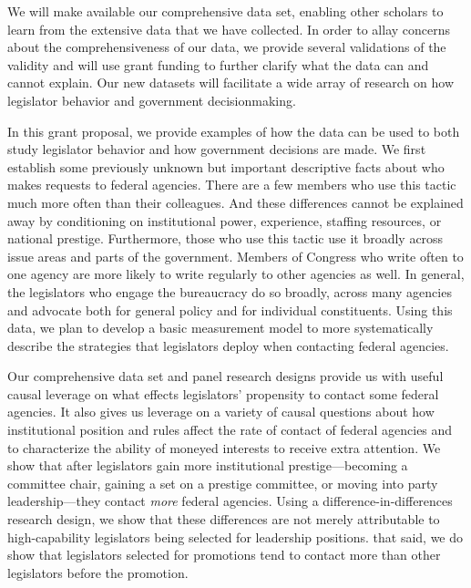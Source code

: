 \documentclass{article}
\begin{document}
We will make available our comprehensive data set, enabling other scholars to learn from the extensive data that we have collected.  In order to allay concerns about the comprehensiveness of our data, we provide several validations of the validity and will use grant funding to further clarify what the data can and cannot explain. Our new datasets will facilitate a wide array of research on how legislator behavior and government decisionmaking.    

In this grant proposal, we provide examples of how the data can be used to both study legislator behavior and how government decisions are made.  We first establish some previously unknown but important descriptive facts about who makes requests to federal agencies. There are a few members who use this tactic much more often than their colleagues.  And these differences cannot be explained away by conditioning on institutional power, experience, staffing resources, or national prestige. Furthermore, those who use this tactic use it broadly across issue areas and parts of the government.  Members of Congress who write often to one agency are more likely to write regularly to other agencies as well.  In general, the legislators who engage the bureaucracy do so broadly, across many agencies and advocate both for general policy and for individual constituents.  Using this data, we plan to develop a basic measurement model to more systematically describe the strategies that legislators deploy when contacting federal agencies. 

Our comprehensive data set and panel research designs provide us with useful causal leverage on what effects legislators' propensity to contact some federal agencies.  It also gives us leverage on a variety of causal questions about how institutional position and rules affect the rate of contact of federal agencies and to characterize the ability of moneyed interests to receive extra attention.  We show that after legislators gain more institutional prestige---becoming a committee chair, gaining a set on a prestige committee, or moving into party leadership---they contact \emph{more} federal agencies.  Using a difference-in-differences research design, we show that these differences are not merely attributable to high-capability legislators being selected for leadership positions.  that said, we do show that legislators selected for promotions tend to contact more than other legislators before the promotion.  
\end{document}
